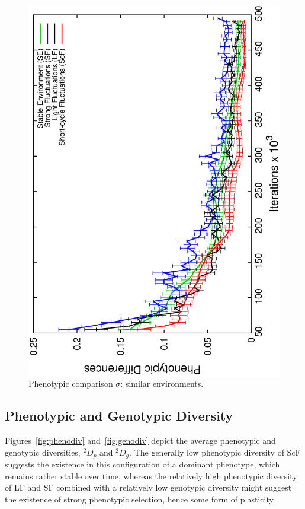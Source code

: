 \begin{figure}[h]
\centering
\includegraphics[width=0.7\columnwidth, angle=-90]{img/ProgressProp}
\caption{Phenotypic comparison $\sigma$: similar environments.}
\label{fig:similar}
\end{figure}

\subsection{Phenotypic and Genotypic Diversity}

Figures~\ref{fig:phenodiv} and~\ref{fig:genodiv} depict the average phenotypic and genotypic diversities, $^2\!D_p$ and $^2\!D_g$. The generally low phenotypic diversity of ScF suggests the existence in this configuration of a dominant phenotype, which remains rather stable over time, whereas the relatively high phenotypic diversity of LF and SF combined with a relatively low genotypic diversity might suggest the existence of strong phenotypic selection, hence some form of plasticity.

